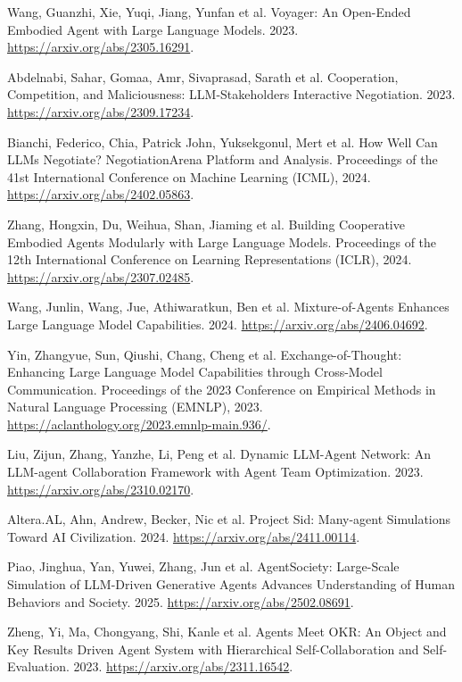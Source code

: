  Wang, Guanzhi, Xie, Yuqi, Jiang, Yunfan et al. Voyager: An Open-Ended Embodied Agent with Large Language Models. 2023. \url{https://arxiv.org/abs/2305.16291}.

 Abdelnabi, Sahar, Gomaa, Amr, Sivaprasad, Sarath et al. Cooperation, Competition, and Maliciousness: {LLM}-Stakeholders Interactive Negotiation. 2023. \url{https://arxiv.org/abs/2309.17234}.

 Bianchi, Federico, Chia, Patrick John, Yuksekgonul, Mert et al. How Well Can {LLM}s Negotiate? {NegotiationArena} Platform and Analysis. Proceedings of the 41st International Conference on Machine Learning (ICML), 2024. \url{https://arxiv.org/abs/2402.05863}.

 Zhang, Hongxin, Du, Weihua, Shan, Jiaming et al. Building Cooperative Embodied Agents Modularly with Large Language Models. Proceedings of the 12th International Conference on Learning Representations (ICLR), 2024. \url{https://arxiv.org/abs/2307.02485}.

 Wang, Junlin, Wang, Jue, Athiwaratkun, Ben et al. Mixture-of-Agents Enhances Large Language Model Capabilities. 2024. \url{https://arxiv.org/abs/2406.04692}.

 Yin, Zhangyue, Sun, Qiushi, Chang, Cheng et al. Exchange-of-Thought: Enhancing Large Language Model Capabilities through Cross-Model Communication. Proceedings of the 2023 Conference on Empirical Methods in Natural Language Processing (EMNLP), 2023. \url{https://aclanthology.org/2023.emnlp-main.936/}.

 Liu, Zijun, Zhang, Yanzhe, Li, Peng et al. Dynamic {LLM}-Agent Network: An {LLM}-agent Collaboration Framework with Agent Team Optimization. 2023. \url{https://arxiv.org/abs/2310.02170}.

 {Altera.AL}, Ahn, Andrew, Becker, Nic et al. Project Sid: Many-agent Simulations Toward {AI} Civilization. 2024. \url{https://arxiv.org/abs/2411.00114}.

 Piao, Jinghua, Yan, Yuwei, Zhang, Jun et al. {AgentSociety}: Large-Scale Simulation of {LLM}-Driven Generative Agents Advances Understanding of Human Behaviors and Society. 2025. \url{https://arxiv.org/abs/2502.08691}.

 Zheng, Yi, Ma, Chongyang, Shi, Kanle et al. Agents Meet {OKR}: An Object and Key Results Driven Agent System with Hierarchical Self-Collaboration and Self-Evaluation. 2023. \url{https://arxiv.org/abs/2311.16542}.

